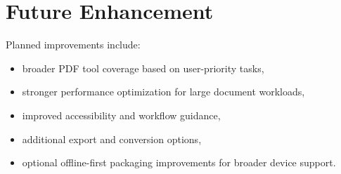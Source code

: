 \section{Future Enhancement}
Planned improvements include:
\begin{itemize}
  \item broader PDF tool coverage based on user-priority tasks,
  \item stronger performance optimization for large document workloads,
  \item improved accessibility and workflow guidance,
  \item additional export and conversion options,
  \item optional offline-first packaging improvements for broader device support.
\end{itemize}
